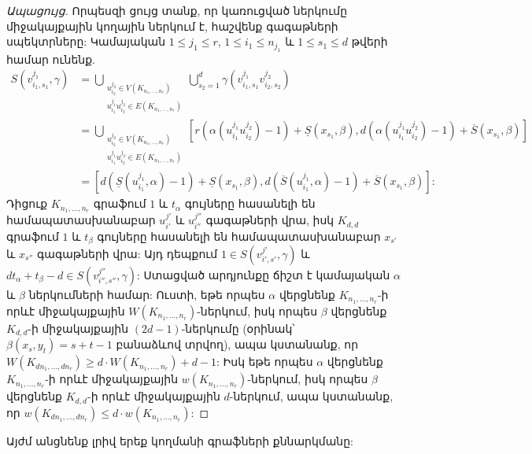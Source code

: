 \begin{proof}[Ապացույց]
Որպեսզի ցույց տանք, որ կառուցված ներկումը միջակայքային կողային ներկում է, հաշվենք գագաթների սպեկտրները: Կամայական $1 \leq j_1 \leq r$, $1\leq i_1 \leq n_{j_1}$ և $1\leq s_1 \leq d$ թվերի համար ունենք.
\begin{align*}
    S\left(v_{i_1,s_1}^{j_1}, \gamma\right) &= \bigcup\limits_{\substack{u_{i_2}^{j_2} \in V(K_{n_1, \ldots, n_r})\\ u_{i_1}^{j_1}u_{i_2}^{j_2} \in E(K_{n_1, \ldots, n_r})}}{
        \bigcup\limits_{s_2=1}^{d}{
            \gamma\left(v_{i_1,s_1}^{j_1}v_{i_2,s_2}^{j_2}\right)
        }
    }\\
    &= \bigcup\limits_{\substack{u_{i_2}^{j_2} \in V(K_{n_1, \ldots, n_r})\\ u_{i_1}^{j_1}u_{i_2}^{j_2} \in E(K_{n_1, \ldots, n_r})}}{
        \left[r(\alpha(u_{i_1}^{j_1}u_{i_2}^{j_2})-1) + \underline{S}(x_{s_1}, \beta), d(\alpha(u_{i_1}^{j_1}u_{i_2}^{j_2})-1) + \overline{S}(x_{s_1}, \beta) \right]
    }\\
    &= \left[d(\underline{S}(u_{i_1}^{j_1}, \alpha)-1) + \underline{S}(x_{s_1}, \beta), d(\overline{S}(u_{i_1}^{j_1},\alpha)-1) + \overline{S}(x_{s_1}, \beta) \right]:
\end{align*}
Դիցուք $K_{n_1, \ldots, n_r}$ գրաֆում $1$ և $t_{\alpha}$ գույները հասանելի են համապատասխանաբար $u_{i'}^{j'}$ և $u_{i''}^{j''}$ գագաթների վրա, իսկ $K_{d,d}$ գրաֆում $1$ և $t_{\beta}$ գույները հասանելի են համապատասխանաբար $x_{s'}$ և $x_{s''}$ գագաթների վրա: Այդ դեպքում $1 \in S\left(v_{i',s'}^{j'}, \gamma\right)$ և $dt_{\alpha}+t_{\beta}-d \in S\left(v_{i'',s''}^{j''}, \gamma\right)$: Ստացված արդյունքը ճիշտ է կամայական $\alpha$ և $\beta$ ներկումների համար: Ուստի, եթե որպես $\alpha$ վերցնենք $K_{n_1, \ldots, n_r}$-ի որևէ միջակայքային $W(K_{n_1, \ldots, n_r})$-ներկում, իսկ որպես $\beta$ վերցնենք $K_{d,d}$-ի միջակայքային $(2d-1)$-ներկումը (օրինակ՝ $\beta(x_s,y_t)=s+t-1$ բանաձևով տրվող), ապա կստանանք, որ $W(K_{dn_1, \ldots, dn_r}) \geq d\cdot W(K_{n_1, \ldots, n_r}) + d-1$: Իսկ եթե որպես $\alpha$ վերցնենք $K_{n_1, \ldots, n_r}$-ի որևէ միջակայքային $w(K_{n_1, \ldots, n_r})$-ներկում, իսկ որպես $\beta$ վերցնենք $K_{d,d}$-ի որևէ միջակայքային $d$-ներկում, ապա կստանանք, որ $w(K_{dn_1, \ldots, dn_r}) \leq d\cdot w(K_{n_1, \ldots, n_r})$:
\end{proof}

Այժմ անցնենք լրիվ երեք կողմանի գրաֆների քննարկմանը:

